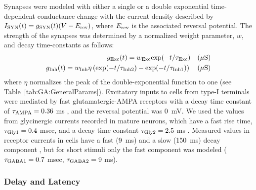 Synapses were modeled with either a single or a double exponential
time-dependent conductance change with the current density described
by $I_{{\rm SYN}} (t)=g_{{\rm SYN}} (t)(V-E_{{\rm rev}} )$, where
$E_{\rm rev}$ is the associated reversal potential. The strength of
the synapses was determined by a normalized weight parameter, $w$, and
decay time-constants as follows:
\begin{eqnarray}
  \label{eq:GA:11}
  g_{{\rm Exc}} (t)=w_{{\rm Exc}} {\rm exp}(-t/\tau _{{\rm Exc}} ) \quad (\mu\mathrm{S}) \\
  \label{eq:GA:12} g_{{\rm Inh}} (t)=w_{{\rm Inh}} \eta \left({\rm exp}(-t/\tau_{{\rm Inh2}} )-{\rm exp}(-t/\tau _{{\rm Inh1}} )\right) \quad (\mu\mathrm{S}) 
\end{eqnarray}
\noindent where $\eta$ normalizes the peak of the double-exponential
function to one (see Table~\ref{tab:GA:GeneralParams}). Excitatory
inputs to {\CN} cells from type-I {\ANF} terminals were mediated by fast
glutamatergic-AMPA receptors with a decay time constant of $\tau
_{{\rm AMPA}} = 0.36$ ms
\citep{Gardner:2000,GardnerTrussellEtAl:1999}, and the reversal
potential was 0~mV. We used the values from glycinergic currents
recorded in mature {\CN} neurons, which have a fast rise time, $\tau_{{\rm Gly1}} = 0.4$ msec, and a decay time constant $\tau_{{\rm Gly2}}
= 2.5$ ms
\citep{AwatramaniTurecekEtAl:2005,HartyManis:1998,LeaoOleskevichEtAl:2004,LimOleskevichEtAl:2003}.
Measured values in \GABAa receptor currents in {\CN} cells have a fast
(9~ms) and a slow (150~ms) decay component
\citep{AwatramaniTurecekEtAl:2005,DavisYoung:2000}, but for short
stimuli only the fast component was modeled ($\tau_{{\rm GABA1}}
=0.7$ msec, $\tau_{{\rm GABA2}} =9$ ms).

\subsubsection{Delay and Latency}

